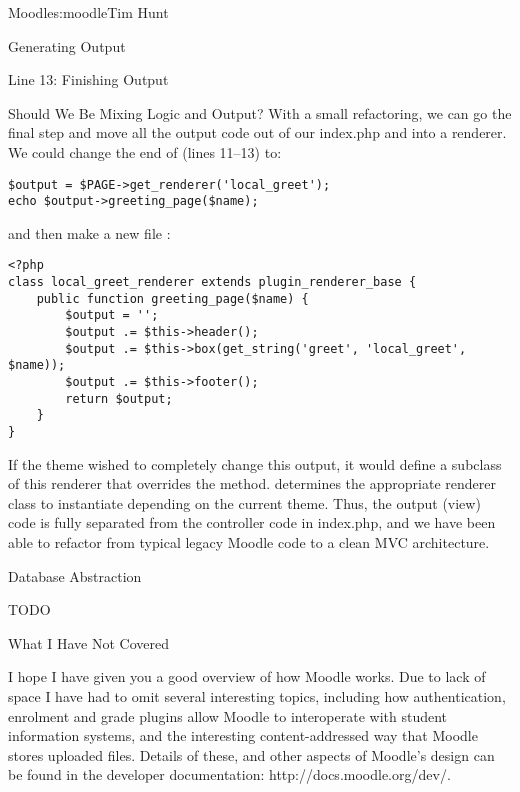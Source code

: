 \begin{aosachapter}{Moodle}{s:moodle}{Tim Hunt}
\begin{aosasect1}{Generating Output}
\begin{aosasect2}{Line 13: Finishing Output}
\begin{aosasect3}{Should We Be Mixing Logic and Output?}
With a small refactoring, we can go the final step and move all the
output code out of our index.php and into a renderer. We could change
the end of  (lines 11--13) to:

\begin{verbatim}
$output = $PAGE->get_renderer('local_greet');
echo $output->greeting_page($name);
\end{verbatim}

and then make a new file :

\begin{verbatim}
<?php
class local_greet_renderer extends plugin_renderer_base {
    public function greeting_page($name) {
        $output = '';
        $output .= $this->header();
        $output .= $this->box(get_string('greet', 'local_greet', $name));
        $output .= $this->footer();
        return $output;
    }
}
\end{verbatim}

If the theme wished to completely change this output, it would define
a subclass of this renderer that overrides the 
method.  determines the
appropriate renderer class to instantiate depending on the current
theme. Thus, the output (view) code is fully separated from the
controller code in index.php, and we have been able to refactor from
typical legacy Moodle code to a clean MVC architecture.

\end{aosasect3}

\end{aosasect2}

\end{aosasect1}

\begin{aosasect1}{Database Abstraction}

TODO

\end{aosasect1}

\begin{aosasect1}{What I Have Not Covered}

I hope I have given you a good overview of how Moodle works. Due to
lack of space I have had to omit several interesting topics, including
how authentication, enrolment and grade plugins allow Moodle to
interoperate with student information systems, and the interesting
content-addressed way that Moodle stores uploaded files. Details of
these, and other aspects of Moodle's design can be found in the
developer documentation: http://docs.moodle.org/dev/.


\end{aosasect1}
\end{aosachapter}
